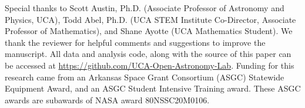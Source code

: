\noindent Special thanks to Scott Austin, Ph.D. (Associate Professor of Astronomy and Physics, UCA), Todd Abel, Ph.D. (UCA STEM Institute Co-Director, Associate Professor of Mathematics), and Shane Ayotte (UCA Mathematics Student). We thank the reviewer for helpful comments and suggestions to improve the manuscript.
All data and analysis code, along with the source of this paper can be accessed at \url{https://github.com/UCA-Open-Astronomy-Lab}.
Funding for this research came from an Arkansas Space Grant Consortium (ASGC) Statewide Equipment Award, and an ASGC Student Intensive Training award. These ASGC awards are subawards of NASA award 80NSSC20M0106. 
